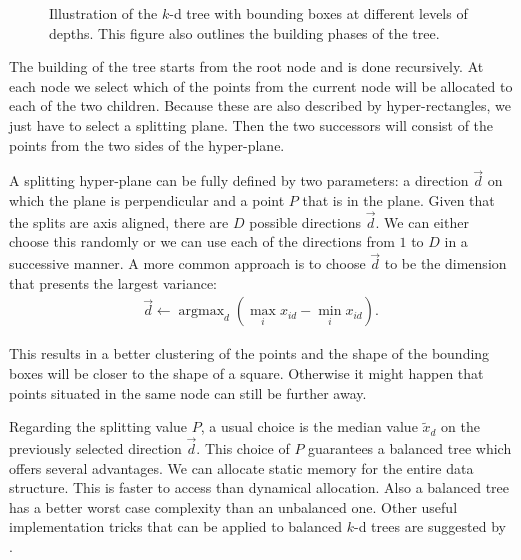 \begin{figure}
  \caption{Illustration of the $k$-d tree with bounding boxes at different
levels of depths. This figure also outlines the building phases of the tree.}
  \label{fig:kdtree}
\end{figure}

The building of the tree starts from the root node and is done recursively. At each
node we select which of the points from the current node will be allocated to each of
the two children. Because these are also described by hyper-rectangles, we just have to select a splitting plane. Then the two successors will consist of the points from the two sides of the hyper-plane. 

A splitting hyper-plane can be fully defined by two parameters: a direction $\vec{d}$ on which the plane is perpendicular and a point $P$  that is in the plane. Given that the splits are axis aligned, there are $D$ possible directions $\vec{d}$. We can either choose this randomly or we can use
each of the directions from $1$ to $D$ in a successive manner. A more common approach is to choose $\vec{d}$ to be the dimension that presents the largest
variance: 
\begin{align}
	\vec{d} \leftarrow \operatorname{argmax}_{d} (\max_ix_{id} -
\min_ix_{id}).
	\label{eq:splitting-direction}
\end{align}

This results in a better clustering of the points and the shape of the bounding boxes will be closer to the shape of a square. Otherwise it might happen that points situated in the same node can still be further away.

Regarding the splitting value $P$, a usual choice is the median value $\tilde{x}_d$ on the previously selected direction $\vec{d}$. This choice of $P$ guarantees a balanced tree which offers several advantages. We can allocate static memory for the entire data structure. This is faster to access than dynamical allocation. Also a balanced tree has a better worst case complexity than an unbalanced one. Other useful implementation tricks that can be applied to balanced $k$-d trees are suggested by \cite{lang2009}.

